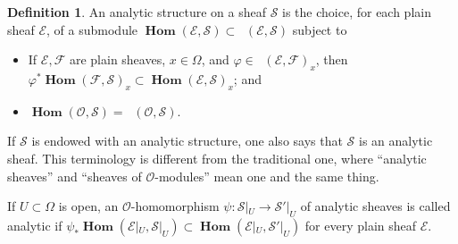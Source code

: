 \documentclass{amsart}
\numberwithin{equation}{section}
\theoremstyle{definition}
\newtheorem{definition}{Definition}[section]
\theoremstyle{plain}
\theoremstyle{remark}
\begin{document}
\begin{definition}\label{defn_applications_anal_str}
An analytic structure on a sheaf ${\ensuremath{\mathcal{{S}}}}$
is the choice, for each plain sheaf ${\ensuremath{\mathcal{{E}}}}$, of a submodule 
${{\mathop{\mathbf{Hom}}}}({\ensuremath{\mathcal{{E}}}},{\ensuremath{\mathcal{{S}}}})\subset{{\mathop{\mathbf{Hom}_{\ensuremath{\mathcal{{O}}}}}}}({\ensuremath{\mathcal{{E}}}},{\ensuremath{\mathcal{{S}}}})$ subject to 
\begin{itemize}
\item If ${\ensuremath{\mathcal{{E}}}},{\ensuremath{\mathcal{{F}}}}$ are plain sheaves, $x\in\Omega$, and 
	$\varphi\in {{\mathop{\mathbf{Hom}_\mathrm{plain}}}}({\ensuremath{\mathcal{{E}}}},{\ensuremath{\mathcal{{F}}}})_x$, then\\
	$\varphi^*{{\mathop{\mathbf{Hom}}}}({\ensuremath{\mathcal{{F}}}},{\ensuremath{\mathcal{{S}}}})_x
	 \subset{{\mathop{\mathbf{Hom}}}}({\ensuremath{\mathcal{{E}}}},{\ensuremath{\mathcal{{S}}}})_x$; and
\item ${{\mathop{\mathbf{Hom}}}}({\ensuremath{\mathcal{{O}}}},{\ensuremath{\mathcal{{S}}}})={{\mathop{\mathbf{Hom}_{\ensuremath{\mathcal{{O}}}}}}}({\ensuremath{\mathcal{{O}}}},{\ensuremath{\mathcal{{S}}}})$.
\end{itemize}
\end{definition}

If ${\ensuremath{\mathcal{{S}}}}$ is endowed with an analytic structure, one also says that 
${\ensuremath{\mathcal{{S}}}}$ is an analytic sheaf. This terminology is different from
the traditional one, where ``analytic sheaves'' and ``sheaves of ${\ensuremath{\mathcal{{O}}}}$-modules''  mean one and the same thing.

If $U\subset\Omega$ is open, an ${\ensuremath{\mathcal{{O}}}}$-homomorphism 
$\psi:{\ensuremath{\mathcal{{S}}}}|_U\rightarrow{\ensuremath{\mathcal{{S}}}}'|_U$ of analytic sheaves
is called analytic if 
$\psi_*{{\mathop{\mathbf{Hom}}}}({\ensuremath{\mathcal{{E}}}}|_U,{\ensuremath{\mathcal{{S}}}}|_U)\subset
{{\mathop{\mathbf{Hom}}}}({\ensuremath{\mathcal{{E}}}}|_U,{\ensuremath{\mathcal{{S}}}}'|_U)$
for every plain sheaf
${\ensuremath{\mathcal{{E}}}}$.
\end{document}
